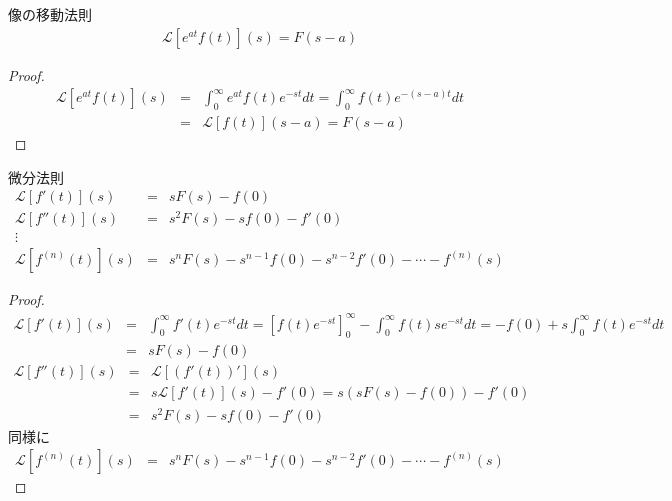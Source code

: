 \documentclass[uplatex, dvipdfmx, fleqn, a4paper, 10pt]{ujreport}
\begin{document}
\begin{exprbox}{像の移動法則}
    \begin{eqnarray}
        \mathcal{L}[e^{at}f(t)](s) = F(s - a)
    \end{eqnarray}
    \begin{proof}
        \begin{eqnarray*}
            \mathcal{L}[e^{at}f(t)](s) &=& \int_{0}^{\infty} e^{at} f(t) e^{-st} dt
            = \int_{0}^{\infty} f(t) e^{-(s - a)t} dt \\
            &=& \mathcal{L}[f(t)](s - a) = F(s - a)
        \end{eqnarray*}
    \end{proof}
\end{exprbox}

\begin{exprbox}{微分法則}
    \begin{eqnarray}
        \mathcal{L}[f'(t)](s) &=& sF(s) - f(0) \\
        \mathcal{L}[f''(t)](s) &=& s^2F(s) - sf(0) - f'(0) \\
        \vdots \\
        \mathcal{L}[f^{(n)}(t)](s) &=& s^nF(s) - s^{n - 1}f(0) - s^{n - 2}f'(0) - \cdots - f^{(n)}(s)
    \end{eqnarray}
    \begin{proof}
        \begin{eqnarray*}
            \mathcal{L}[f'(t)](s) &=& \int_{0}^{\infty} f'(t) e^{-st} dt
            = \left[f(t) e^{-st}\right]_0^\infty - \int_{0}^{\infty} f(t) se^{-st} dt
            = -f(0) + s \int_{0}^{\infty} f(t) e^{-st} dt\\
            &=& sF(s) - f(0)
        \end{eqnarray*}
        \begin{eqnarray*}
            \mathcal{L}[f''(t)](s) &=& \mathcal{L}[\left(f'(t)\right)'](s) \\
            &=& s \mathcal{L}[f'(t)](s) - f'(0) = s\left(sF(s) - f(0)\right) - f'(0) \\
            &=& s^2 F(s) - s f(0) - f'(0)
        \end{eqnarray*}
        同様に
        \begin{eqnarray*}
            \mathcal{L}[f^{(n)}(t)](s) &=& s^nF(s) - s^{n - 1}f(0) - s^{n - 2}f'(0) - \cdots - f^{(n)}(s)
        \end{eqnarray*}
    \end{proof}
\end{exprbox}
\end{document}
